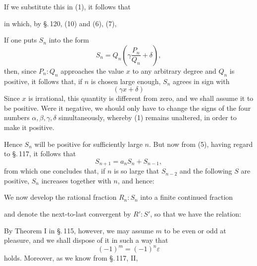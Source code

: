 
If we substitute this in (1), it follows that


in which, by \S.\,120, (10) and (6), (7),



If one puts $S_n$ into the form
\[
S_n = Q_n\left(\gamma \frac{P_n}{Q_n} + \delta\right),
\]
then, since $P_n : Q_n$ approaches the value $x$ to any arbitrary degree and $Q_n$ is positive, it follows that, if $n$ is chosen large enough, $S_n$ agrees in sign with
\[
(\gamma x + \delta)
\]
Since $x$ is irrational, this quantity is different from zero, and we shall assume it to be positive. Were it negative, we should only have to change the signs of the four numbers $\alpha, \beta, \gamma, \delta$ simultaneously, whereby (1) remains unaltered, in order to make it positive.

Hence $S_n$ will be positive for sufficiently large $n$. But now from (5), having regard to \S.\,117, it follows that
\[
S_{n+1} = a_n S_n + S_{n-1},
\]
from which one concludes that, if $n$ is so large that $S_{n-2}$ and the following $S$ are positive, $S_n$ increases together with $n$, and hence:


We now develop the rational fraction $R_n : S_n$ into a finite continued fraction


and denote the next-to-last convergent by $R' : S'$, so that we have the relation:


By Theorem I in \S.\,115, however, we may assume $m$ to be even or odd at pleasure, and we shall dispose of it in such a way that
\[
(-1)^m = (-1)^n \varepsilon
\]
holds. Moreover, as we know from \S.\,117, II,
